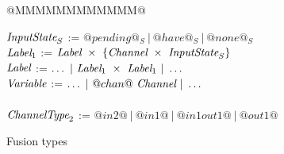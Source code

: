 
\newcommand\nextStep[5]{\big((#1,~#2),~(#3,~#4),~#5 \big)}

\begin{figure}

\begin{tabbing}
@MMMMMMMMMMMM@   \TABDEF \kill

$\textit{InputState}_S$ \> := \> $@pending@_S ~|~ @have@_S ~|~ @none@_S$
\\
$\textit{Label}_1$ \> := \> $\textit{Label}~\times~\{\textit{Channel} ~\times~ \textit{InputState}_S\}$ \\
$\textit{Label}$   \> := \> $\ldots ~|~\textit{Label}_1~\times~\textit{Label}_1 ~|~ \ldots$ \\
$\textit{Variable}$     \> := \> $\ldots ~|~@chan@~\textit{Channel} ~|~ \ldots$ \\
\\

$\textit{ChannelType}_2$   \> := \> $@in2@~|~@in1@~|~@in1out1@~|~@out1@$ \\
\end{tabbing}

\caption{Fusion types}
\label{fig:Fusion:Types}
\end{figure}

